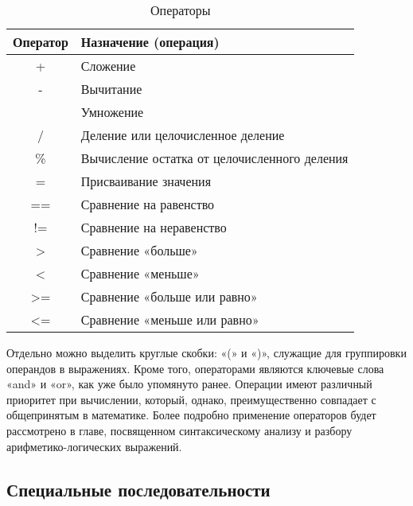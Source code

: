 \begin{table}[h]
    \centering
    \caption{Операторы}
    \label{tab:operators}
    \begin{tabular}{>{\ttfamily}c p{10cm}}
        \toprule
        \textrm{\normalfont Оператор} & \textrm{\normalfont Назначение (операция)}   \\
        \midrule
        +                             & Сложение                                     \\
        -                             & Вычитание                                    \\
        *                             & Умножение                                    \\
        /                             & Деление или целочисленное деление            \\
        \%                            & Вычисление остатка от целочисленного деления \\
        =                             & Присваивание значения                        \\
        ==                            & Сравнение на равенство                       \\
        !=                            & Сравнение на неравенство                     \\
        >                             & Сравнение «больше»                           \\
        <                             & Сравнение «меньше»                           \\
        >=                            & Сравнение «больше или равно»                 \\
        <=                            & Сравнение «меньше или равно»                 \\
        \bottomrule
    \end{tabular}
\end{table}

Отдельно можно выделить круглые скобки: «(» и «)», служащие для группировки операндов в выражениях. Кроме того, операторами являются ключевые слова «and» и «or», как уже было упомянуто ранее. Операции имеют различный приоритет при вычислении, который, однако, преимущественно совпадает с общепринятым в математике. Более подробно применение операторов будет рассмотрено в главе, посвященном синтаксическому анализу и разбору арифметико-логических выражений.

\subsection{Специальные последовательности}

